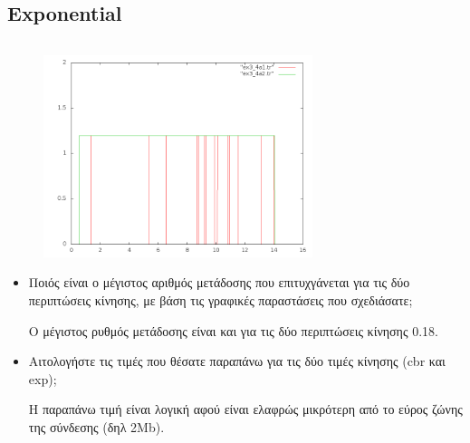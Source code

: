 \documentclass[a4paper,9pt]{article}
\begin{document}
\subsection{Exponential}
\inputminted[fontsize=\footnotesize]{tcl}{files/ex3_4a2.tcl}
\begin{figure}[H]
    \centering
    \includegraphics[width=0.7\textwidth]{files/graph2.png}
\end{figure}

\begin{itemize}
    \item Ποιός είναι ο μέγιστος αριθμός μετάδοσης που επιτυχγάνεται για τις δύο
        περιπτώσεις κίνησης, με βάση τις γραφικές παραστάσεις που σχεδιάσατε;

        Ο μέγιστος ρυθμός μετάδοσης είναι και για τις δύο περιπτώσεις κίνησης 0.18.
    \item Αιτολογήστε τις τιμές που θέσατε παραπάνω για τις δύο τιμές κίνησης (cbr
        και exp);

        H παραπάνω τιμή είναι λογική αφού είναι ελαφρώς μικρότερη από το εύρος ζώνης
        της σύνδεσης (δηλ 2Mb).
\end{itemize}
\end{document}
